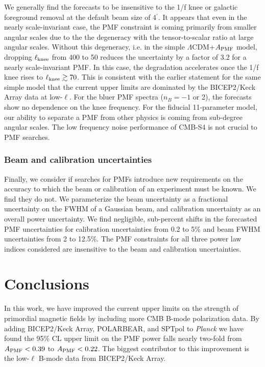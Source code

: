 \documentclass[apj]{emulateapj}
\newcommand{\apmf}{\ensuremath{A_{\rm PMF}}}
\newcommand{\lcdm}{\ensuremath{\Lambda}CDM}
\newcommand{\lknee}{\ensuremath{\ell_{\rm knee}}}
\newcommand{\planck}{{\sl Planck}}
\newcommand{\bicepkeck}{BICEP2/Keck Array}
\newcommand{\pb}{POLARBEAR}
\newcommand{\sptpol}{SPTpol}
\begin{document}
We generally find the forecasts to be insensitive to the 1/f knee or galactic foreground removal at the default beam size of 4$^\prime$. 
It appears that even in the nearly scale-invariant case, the PMF constraint is coming primarily from smaller angular scales due to the the degeneracy with the tensor-to-scalar ratio at large angular scales. 
Without this degeneracy, i.e. in the simple \lcdm{}+\apmf{} model, dropping \lknee{} from 400 to 50 reduces the uncertainty by a factor of 3.2 for a nearly scale-invariant PMF. 
In this case, the degradation accelerates once the 1/f knee rises to $\lknee{} \gtrsim 70$. 
This is consistent with the earlier statement for the same simple model that the current upper limits are dominated by the BICEP2/Keck Array data at low-$\ell$. 
For the bluer PMF spectra ($n_B=-1$ or 2), the forecasts show no dependence on the knee frequency. 
For the fiducial 11-parameter model, our ability to separate a PMF from other physics is coming from sub-degree angular scales. 
The low frequency noise performance of CMB-S4 is not crucial to PMF searches. 


\subsubsection{Beam and calibration uncertainties}
\label{subsec:beamcal}

Finally, we consider if searches for PMFs introduce new requirements on the accuracy to which the beam or  calibration of an experiment must be known. 
We find they do not. 
We parameterize the beam uncertainty as a fractional uncertainty on the FWHM of a Gaussian beam, and calibration uncertainty as an overall power uncertainty. 
We find negligible, sub-percent shifts in the forecasted PMF uncertainties for calibration uncertainties from 0.2 to 5\% and beam FWHM uncertainties from 2 to 12.5\%. 
The PMF constraints  for all three power law indices considered are insensitive to the beam and calibration uncertainties. 

\section{Conclusions}
\label{sec:conclusions}

In this work, we have improved the current upper limits on the strength of   primordial magnetic fields by including more CMB B-mode polarization data. 
By adding \bicepkeck{}, \pb, and \sptpol{} to \planck{} we have found the 95\% CL upper limit on the PMF power falls nearly two-fold from $\apmf < \upperAplk$ to $\apmf < \upperAall$. 
The biggest contributor to this improvement is the low-$\ell$ B-mode data from \bicepkeck{}. 
\end{document}

